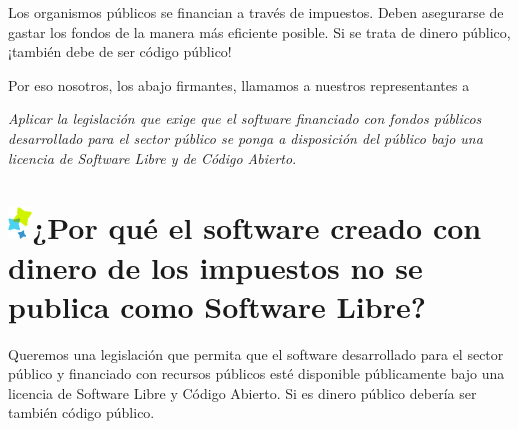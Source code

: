 \documentclass[10pt,foldmark,tumble]{leaflet}
\begin{document}
    Los organismos públicos se financian a través de impuestos. Deben asegurarse de gastar los fondos de la manera más eficiente posible. Si se trata de dinero público, ¡también debe de ser código público!

    Por eso nosotros, los abajo firmantes, llamamos a nuestros representantes a

    \emph{Aplicar la legislación que exige que el software financiado con fondos públicos desarrollado para el sector público se ponga a disposición del público bajo una licencia de Software Libre y de Código Abierto}.


\newpage

\vspace{5em}

\section{\includegraphics{item.png}¿Por qué el software creado con dinero de los impuestos no se publica como Software Libre?}

\vspace{2em}

\large{
Queremos una legislación que permita que el software desarrollado para el sector público y financiado con recursos públicos esté disponible públicamente bajo una licencia de Software Libre y Código Abierto. Si es dinero público debería ser también código público.
}

\vspace{3em}

\huge



\newpage
\end{document}
